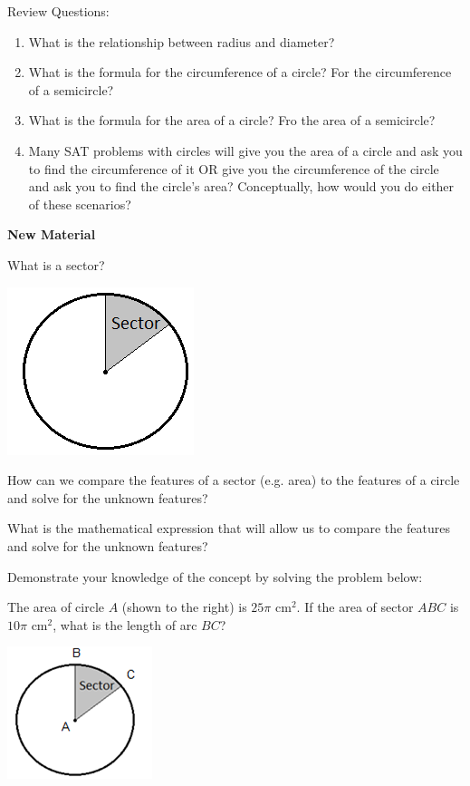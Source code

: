 \bigskip
Review Questions:

\begin{enumerate}
\item What is the relationship between radius and diameter?
\vfill\item What is the formula for the circumference of a circle? For the circumference of a semicircle?
\vfill\item What is the formula for the area of a circle? Fro the area of a semicircle?
\vfill\item Many SAT problems with circles will give you the area of a circle and ask you to find the circumference of it OR give you the circumference of the circle and ask you to find the circle's area? Conceptually, how would you do either of these scenarios?
\end{enumerate}

\vfill
\newpage
\textbf{New Material}

\bigskip
What is a sector?

\hfill\includegraphics{16}

How can we compare the features of a sector (e.g. area) to the features of a circle and solve for the unknown features?

\vfill
What is the mathematical expression that will allow us to compare the features and solve for the unknown features?

\vfill
Demonstrate your knowledge of the concept by solving the problem below:

\bigskip
The area of circle $A$ (shown to the right) is $25\pi$ cm$^2$. If the area of sector $ABC$ is $10\pi$ cm$^2$, what is the length of arc $BC$?

\hfill\includegraphics{17}

